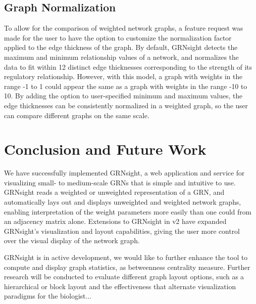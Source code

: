 \documentclass[sigconf,review]{acmart}
\begin{document}
\subsection{Graph Normalization}
To allow for the comparison of weighted network graphs, a feature request was made for the user to have the option to customize the normalization factor applied to the edge thickness of the graph. By default, GRNsight detects the maximum and minimum relationship values of a network, and normalizes the data to fit within 12 distinct edge thicknesses corresponding to the strength of its regulatory relationship. However, with this model, a graph with weights in the range -1 to 1 could appear the same as a graph with weights in the range -10 to 10. By adding the option to user-specified minimum and maximum values, the edge thicknesses can be consistently normalized in a weighted graph, so the user can compare different graphs on the same scale. 

\section{Conclusion and Future Work}
We have successfully implemented GRNsight, a web application and service for visualizing small- to medium-scale GRNs that is simple and intuitive to use. GRNsight reads a weighted or unweighted representation of a GRN, and automatically lays out and displays unweighted and weighted network graphs, enabling interpretation of the weight parameters more easily than one could from an adjacency matrix alone. Extensions to GRNsight in v2 have expanded GRNsight's visualization and layout capabilities, giving the user more control over the visual display of the network graph.

GRNsight is in active development, we would like to further enhance the tool to compute and display graph statistics, as betweenness centrality measure. Further research will be conducted to evaluate different graph layout options, such as a hierarchical or block layout and the effectiveness that alternate visualization paradigms for the biologist...


 
\end{document}
